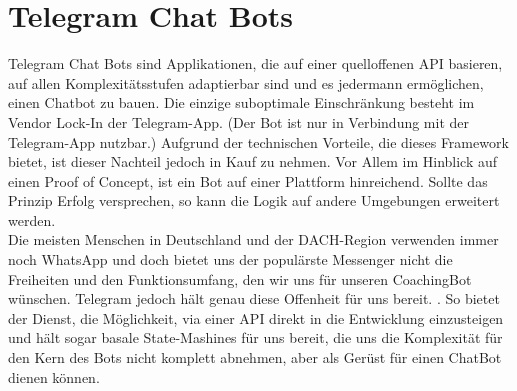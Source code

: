     \section{Telegram Chat Bots}
    Telegram Chat Bots sind Applikationen, die auf einer quelloffenen API \cite{telegramAPI} basieren, auf allen Komplexitätsstufen adaptierbar sind und es jedermann ermöglichen, einen Chatbot zu bauen. Die einzige suboptimale Einschränkung besteht im Vendor Lock-In der Telegram-App. (Der Bot ist nur in Verbindung mit der Telegram-App \cite{telegram} nutzbar.) Aufgrund der technischen Vorteile, die dieses Framework bietet, ist dieser Nachteil jedoch in Kauf zu nehmen. Vor Allem im Hinblick auf einen Proof of Concept, ist ein Bot auf einer Plattform hinreichend. Sollte das Prinzip Erfolg versprechen, so kann die Logik auf andere Umgebungen erweitert werden. \\
    Die meisten Menschen in Deutschland und der DACH-Region verwenden immer noch WhatsApp \cite{Nutzerzahlen} und doch bietet uns der populärste Messenger nicht die Freiheiten und den Funktionsumfang, den wir uns für unseren CoachingBot wünschen. Telegram jedoch hält genau diese Offenheit für uns bereit. \cite{telegramVergleich}. So bietet der Dienst, die Möglichkeit, via einer API direkt in die Entwicklung einzusteigen und hält sogar basale State-Mashines für uns bereit, die uns die Komplexität für den Kern des Bots nicht komplett abnehmen, aber als Gerüst für einen ChatBot dienen können.


